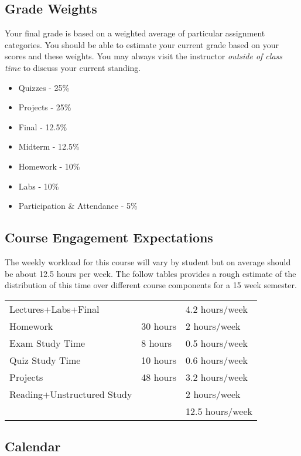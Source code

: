 \documentclass[10pt]{article}
\begin{document}
\subsection{Grade Weights}
Your final grade is based on a weighted average of particular assignment categories.  You should be able to estimate your current grade based on your scores and these weights.  You may always visit the instructor \textit{outside of class time} to discuss your current standing.  
\begin{itemize}
\item Quizzes - 25\%
\item Projects - 25\%
\item Final - 12.5\%
\item Midterm - 12.5\%
\item Homework - 10\%
\item Labs - 10\%
\item Participation \& Attendance - 5\%
\end{itemize} 


\subsection{Course Engagement Expectations}

The weekly workload for this course will vary by student but on average should be about 12.5 hours per week.  The follow tables provides a rough estimate of the distribution of this time over different course components for a 15 week semester. 
\begin{center}
\begin{tabular}{|l|l|l|}
\hline
Lectures+Labs+Final &      & 4.2 hours/week \\ 
Homework & 30 hours        & 2 hours/week \\
Exam Study Time & 8 hours  & 0.5 hours/week \\ 
Quiz Study Time & 10 hours & 0.6 hours/week \\
Projects & 48 hours        & 3.2 hours/week \\
Reading+Unstructured Study & & 2 hours/week \\
\hline 
& & 12.5 hours/week \\ 
\hline
\end{tabular}
\end{center}


\subsection{Calendar}
\end{document}

